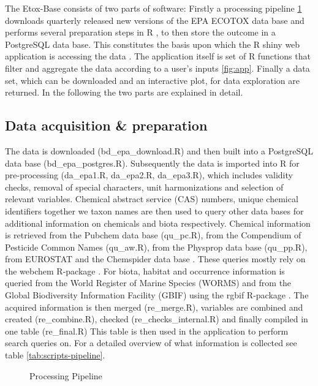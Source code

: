 \documentclass[english]{article}
\newcommand{\etoxbase}{Etox-Base}
\newcommand{\epa}{EPA ECOTOX data base}
\begin{document}
The \etoxbase{} consists of two parts of software: Firstly a processing pipeline \ref{fig:pipeline} downloads quarterly released new versions of the \epa{} and performs several preparation steps in R \citep{r_core_team_r_2017}, to then store the outcome in a PostgreSQL data base. This constitutes the basis upon which the R shiny web application is accessing the data \citep{r_core_team_r_2017}. The application itself is set of R functions that filter and aggregate the data according to a user's inputs \ref{fig:app}. Finally a data set, which can be downloaded and an interactive plot, for data exploration are returned. In the following the two parts are explained in detail.

\subsection*{Data acquisition \& preparation}

The data is downloaded (bd\_epa\_download.R) and then built into a PostgreSQL data base (bd\_epa\_postgres.R). Subsequently the data is imported into R for pre-processing (da\_epa1.R, da\_epa2.R, da\_epa3.R), which includes validity checks, removal of special characters, unit harmonizations and selection of relevant variables. Chemical abstract service (CAS) numbers, unique chemical identifiers together we taxon names are then used to query other data bases for additional information on chemicals and biota respectively. Chemical information is retrieved from the Pubchem data base \citep{CITE_PUBCHEM} (qu\_pc.R), from the Compendium of Pesticide Common Names \citep{CITE_AW} (qu\_aw.R), from the Physprop data base \citep{CITE_PHYSPROP} (qu\_pp.R), from EUROSTAT and the Chemspider data base \citep{CITE-CHEMSPIDER}. These queries mostly rely on the webchem R-package \citep{szocs_webchem_2015-1}. For biota, habitat and occurrence information is queried from the World Register of Marine Species (WORMS) \citep{WORMS} and from the Global Biodiversity Information Facility (GBIF) \citep{CITE_RGBIF} using the rgbif R-package \citep{chamberlain_rgbif_2018}. The acquired information is then merged (re\_merge.R), variables are combined and created (re\_combine.R), checked (re\_checks\_internal.R) and finally compiled in one table (re\_final.R) This table is then used in the application to perform search queries on. For a detailed overview of what information is collected see table \ref{tab:scripts-pipeline}.

\begin{figure}
    
    \caption{Processing Pipeline}
    \label{fig:pipeline}
\end{figure}
\end{document}
